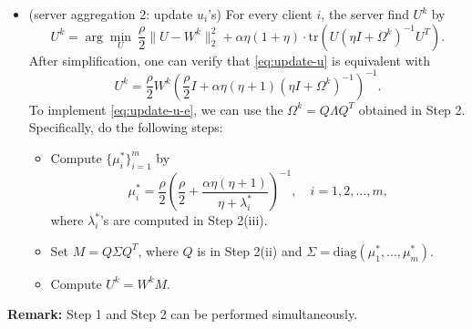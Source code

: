 {\begin{itemize}
    \item[Step 3.] (server aggregation 2: update $u_i$'s) For every client $i$, the server find $U^k$ by
    \begin{equation}
        \label{eq:update-u}
        U^k = \arg\min_{U} \ \frac{\rho}{2}\|U - W^k\|_2^2 + \alpha\eta(1 + \eta)\cdot\mbox{tr}(U(\eta I + \Omega^k)^{-1} U^T).
    \end{equation}
    After simplification, one can verify that \eqref{eq:update-u} is equivalent with 
    \begin{equation}
        \label{eq:update-u-e}
        U^k = \frac{\rho}{2}W^k\left( \frac{\rho}{2}I + \alpha\eta(\eta+1)(\eta I + \Omega^k)^{-1}\right)^{-1}.
    \end{equation}
    To implement \eqref{eq:update-u-e}, we can use the $\Omega^k = Q\Lambda Q^T$ obtained in Step 2. Specifically, do the following steps:
    \begin{itemize}
        \item[(i)] Compute $\{\mu_i^*\}_{i=1}^m$ by
        $$ \mu_i^* = \frac{\rho}{2}\left( \frac{\rho}{2} + \frac{\alpha\eta(\eta+1)}{\eta+\lambda_i^*}\right)^{-1}, \quad i=1,2,\dots,m,$$
        where $\lambda_i^*$'s are computed in Step 2(iii).
        \item[(ii)] Set $M = Q\Sigma Q^T$, where $Q$ is in Step 2(ii) and $\Sigma = \mbox{diag}(\mu_1^*,\dots,\mu_m^*)$.
        \item[(iii)] Compute $U^k = W^kM$.
    \end{itemize}
\end{itemize}

\medskip
\noindent
{\bf Remark:} Step 1 and Step 2 can be performed simultaneously.

}
